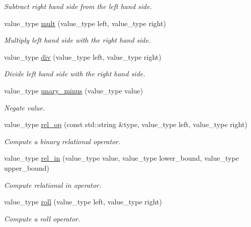 \begin{DoxyCompactItemize}
\begin{DoxyCompactList}\small\item\em Subtract right hand side from the left hand side. \end{DoxyCompactList}\item 
value\+\_\+type \mbox{\hyperlink{classdice_1_1direct__interpreter_a147528647247f61f2f2fdf3fc7423cf7}{mult}} (value\+\_\+type left, value\+\_\+type right)
\begin{DoxyCompactList}\small\item\em Multiply left hand side with the right hand side. \end{DoxyCompactList}\item 
value\+\_\+type \mbox{\hyperlink{classdice_1_1direct__interpreter_a69699f6f1f45355555ffd828476f1c93}{div}} (value\+\_\+type left, value\+\_\+type right)
\begin{DoxyCompactList}\small\item\em Divide left hand side with the right hand side. \end{DoxyCompactList}\item 
value\+\_\+type \mbox{\hyperlink{classdice_1_1direct__interpreter_a3af601a42a6f731123331eb1862e4ccc}{unary\+\_\+minus}} (value\+\_\+type value)
\begin{DoxyCompactList}\small\item\em Negate value. \end{DoxyCompactList}\item 
value\+\_\+type \mbox{\hyperlink{classdice_1_1direct__interpreter_a68034c4e3a4bf4c69286dc234a85d578}{rel\+\_\+op}} (const std\+::string \&type, value\+\_\+type left, value\+\_\+type right)
\begin{DoxyCompactList}\small\item\em Compute a binary relational operator. \end{DoxyCompactList}\item 
value\+\_\+type \mbox{\hyperlink{classdice_1_1direct__interpreter_a4d0d65c115bd1775fc14be9106d6670b}{rel\+\_\+in}} (value\+\_\+type value, value\+\_\+type lower\+\_\+bound, value\+\_\+type upper\+\_\+bound)
\begin{DoxyCompactList}\small\item\em Compute relational in operator. \end{DoxyCompactList}\item 
value\+\_\+type \mbox{\hyperlink{classdice_1_1direct__interpreter_a621e658b8bc5343da7e99d17486ddad6}{roll}} (value\+\_\+type left, value\+\_\+type right)
\begin{DoxyCompactList}\small\item\em Compute a roll operator. \end{DoxyCompactList}\item 

\end{DoxyCompactItemize}
